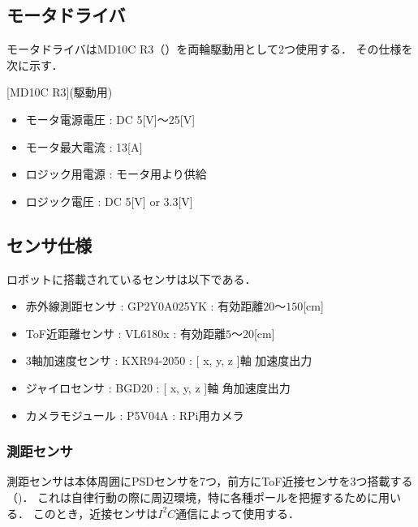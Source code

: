 \documentclass[11pt,a4]{jsarticle}
\begin{document}

  \subsection{モータドライバ}
    モータドライバはMD10C R3（）を両輪駆動用として2つ使用する．
    その仕様を次に示す．

    [MD10C R3](駆動用)
    \begin{itemize}
     \item モータ電源電圧 : DC 5[V]$〜$25[V]
     \item モータ最大電流 : 13[A]
     \item ロジック用電源 : モータ用より供給
     \item ロジック電圧   : DC 5[V] or 3.3[V]
    \end{itemize}


  \subsection{センサ仕様}
    ロボットに搭載されているセンサは以下である．
    \begin{itemize}
     \item 赤外線測距センサ : GP2Y0A025YK : 有効距離$20 〜 150$[cm]
     \item ToF近距離センサ : VL6180x    : 有効距離$5 〜 20$[cm]
     \item 3軸加速度センサ : KXR94-2050 : [ x, y, z ]軸 加速度出力
     \item ジャイロセンサ : BGD20 : [ x, y, z ]軸 角加速度出力
     \item カメラモジュール : P5V04A : RPi用カメラ
    \end{itemize}

    \subsubsection{測距センサ}
      測距センサは本体周囲にPSDセンサを7つ，前方にToF近接センサを3つ搭載する（)．
      これは自律行動の際に周辺環境，特に各種ポールを把握するために用いる．
      このとき，近接センサは$I^2 C$通信によって使用する．
\end{document}
